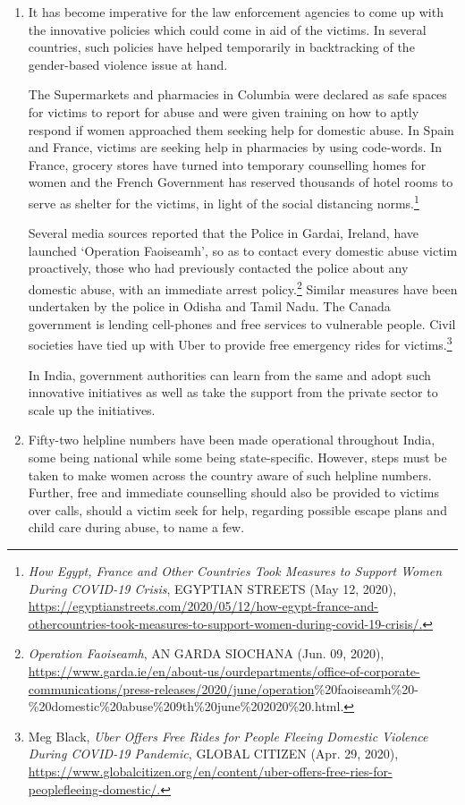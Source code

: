 \begin{multicols}{2}
\begin{enumerate}
\itemsep=0pt
\item It has become imperative for the law enforcement agencies to come up with the
innovative policies which could come in aid of the victims. In several countries, such
policies have helped temporarily in backtracking of the gender-based violence issue at
hand.

The Supermarkets and pharmacies in Columbia were declared as safe spaces for
victims to report for abuse and were given training on how to aptly respond if women
approached them seeking help for domestic abuse. In Spain and France, victims are
seeking help in pharmacies by using code-words. In France, grocery stores have turned into temporary counselling homes for women and the French Government has
reserved thousands of hotel rooms to serve as shelter for the victims, in light of the
social distancing norms.\footnote{\textit{How Egypt, France and Other Countries Took Measures to Support Women During COVID-19 Crisis},
EGYPTIAN STREETS (May 12, 2020), \url{https://egyptianstreets.com/2020/05/12/how-egypt-france-and-othercountries-took-measures-to-support-women-during-covid-19-crisis/.}}

Several media sources reported that the Police in Gardai, Ireland, have launched
‘Operation Faoiseamh’, so as to contact every domestic abuse victim proactively,
those who had previously contacted the police about any domestic abuse, with an
immediate arrest policy.\footnote{\textit{Operation Faoiseamh}, AN GARDA SIOCHANA (Jun. 09, 2020),\\ \url{https://www.garda.ie/en/about-us/ourdepartments/office-of-corporate-communications/press-releases/2020/june/operation}\%20faoiseamh\%20-
\%20domestic\%20abuse\%209th\%20june\%202020\%20.html.} Similar measures have been undertaken by the police in
Odisha and Tamil Nadu. The Canada government is lending cell-phones and free
services to vulnerable people. Civil societies have tied up with Uber to provide free
emergency rides for victims.\footnote{Meg Black, \textit{Uber Offers Free Rides for People Fleeing Domestic Violence During COVID-19 Pandemic},
GLOBAL CITIZEN (Apr. 29, 2020), \url{https://www.globalcitizen.org/en/content/uber-offers-free-ries-for-peoplefleeing-domestic/.}}

In India, government authorities can learn from the same and adopt such innovative
initiatives as well as take the support from the private sector to scale up the initiatives. 

\item Fifty-two helpline numbers have been made operational throughout India, some being
national while some being state-specific. However, steps must be taken to make
women across the country aware of such helpline numbers. Further, free and
immediate counselling should also be provided to victims over calls, should a victim
seek for help, regarding possible escape plans and child care during abuse, to name a
few. 


\end{enumerate}
\end{multicols}

